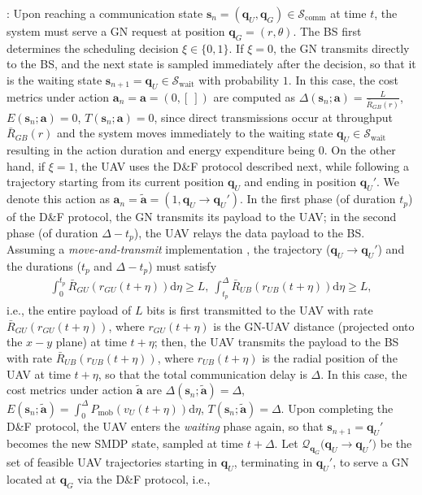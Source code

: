 \documentclass[12pt, draftcls, onecolumn]{IEEEtran}
\theoremstyle{plain}
\theoremstyle{definition}
\theoremstyle{remark}
\begin{document}
:
Upon reaching a communication state $\mathbf{s}_{n}{=}(\mathbf{q}_{U},\mathbf{q}_{G}){\in}\mathcal{S}_{\mathrm{comm}}$ at time $t$, the system must serve a GN request at position $\mathbf{q}_{G}=(r,\theta)$. The BS first determines the scheduling decision $\xi{\in}\{0,1\}$. If $\xi{=}0$, the GN transmits directly to the BS, and the next state is sampled immediately after the decision, so that it is the waiting state $\mathbf{s}_{n{+}1}{=}\mathbf{q}_{U}{\in}\mathcal{S}_{\mathrm{wait}}$ with probability $1$. In this case, the cost metrics under action $\mathbf{a}_{n}{=}\mathbf{a}{=}(0,[\ ])$ are computed as $\Delta(\mathbf{s}_{n};\mathbf{a}){=}\frac{L}{\bar R_{GB}(r)}$, $E(\mathbf{s}_{n};\mathbf{a}){=}0$, $T(\mathbf{s}_{n};\mathbf{a}){=}0$, since direct transmissions occur at throughput $\bar{R}_{GB}(r)$ and the system moves immediately to the waiting state $\mathbf{q}_{U}{\in}\mathcal{S}_{\mathrm{wait}}$ resulting in the action duration and energy expenditure being $0$. On the other hand, if $\xi{=}1$, the UAV uses the D\&F protocol described next, while following a trajectory starting from its current position $\mathbf{q}_{U}$ and ending in position $\mathbf{q}_{U}'$. We denote this action as $\mathbf{a}_{n}{=}\mathbf{\tilde{a}}{=}(1,\mathbf{q}_{U}{\rightarrow}{\mathbf{q}}_{U}')$. In the first phase (of duration $t_{p}$) of the D\&F protocol, the GN transmits its payload to the UAV; in the second phase (of duration $\Delta{-}t_{p}$), the UAV relays the data payload to the BS. Assuming a \emph{move-and-transmit} implementation \cite{SCA}, the trajectory ($\mathbf{q}_{U}{\rightarrow}{\mathbf{q}}_{U}'$) and the durations ($t_{p}$ and $\Delta{-}t_{p}$) must satisfy
\begin{align}\label{eq:PLConst0}
	\int_{0}^{t_{p}} \bar{R}_{GU}(r_{GU}(t+\eta)) \mathrm d \eta \geq L, \ \int_{t_p}^{\Delta} \bar R_{UB}(r_{UB}(t+\eta)) \mathrm d \eta \geq L,
\end{align}
i.e., the entire payload of $L$ bits is first transmitted to the UAV with rate $\bar R_{GU}(r_{GU}(t{+}\eta))$, where $r_{GU}(t{+}{\eta})$ is the GN-UAV distance (projected onto the $x{-}y$ plane) at time $t{+}\eta$; then, the UAV transmits the payload to the BS with rate $\bar{R}_{UB}(r_{UB}(t{+}\eta))$, where $r_{UB}(t{+}\eta)$ is the radial position of the UAV at time $t{+}\eta$, so that the total communication delay is $\Delta$.  In this case, the cost metrics under action $\mathbf{\tilde{a}}$ are $\Delta(\mathbf{s}_{n};\mathbf{\tilde{a}}){=}\Delta$, $E(\mathbf{s}_{n};\mathbf{\tilde{a}}){=}\int_0^\Delta P_{\mathrm{mob}}\left(v_{U}(t{+}\eta)\right)\mathrm{d}\eta$, $T(\mathbf{s}_{n};\mathbf{\tilde{a}}){=}\Delta$. Upon completing the D\&F protocol, the UAV enters the \emph{waiting} phase again, so that $\mathbf{s}_{n{+}1}{=}\mathbf{q}_{U}'$ becomes the new SMDP state, sampled at time $t{+}\Delta$. Let $\mathcal{Q}_{\mathbf{q}_{G}}\big(\mathbf{q}_{U}{\rightarrow}{\mathbf{q}}_{U}'\big)$ be the set of feasible UAV trajectories starting in $\mathbf{q}_{U}$, terminating in $\mathbf{q}_{U}'$, to serve a GN located at $\mathbf{q}_{G}$ via the D\&F protocol, i.e.,
\end{document}
